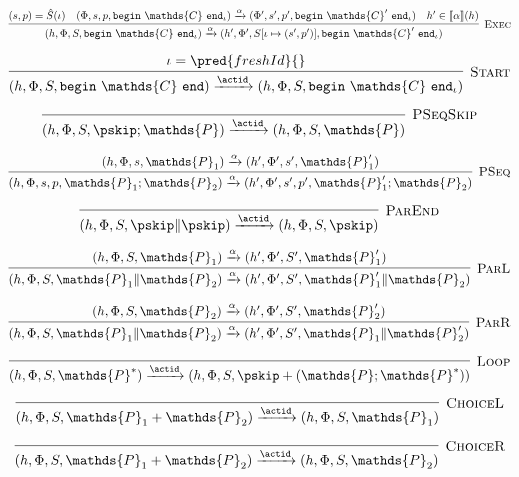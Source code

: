 \[
\infer[\textsc{Exec}]
{
	 (h, \Phi, S, \mathtt{begin}\ \mathds{C}\ \mathtt{end}_\iota)
	\xrightarrow{\alpha}
	(h', \Phi', S[\iota \mapsto (s', p')], \mathtt{begin}\ \mathds{C}'\ \mathtt{end}_\iota)
}
{
	(s, p) = \hat{S}(\iota) &
	(\Phi, s, p, \mathtt{begin}\ \mathds{C}\ \mathtt{end}_\iota)
	\xrightarrow{\alpha}
	(\Phi', s', p', \mathtt{begin}\ \mathds{C}'\ \mathtt{end}_\iota) &
	h' \in \llbracket \alpha \rrbracket (h)
}
\]

\[
\infer[\textsc{Start}]
{
	(h, \Phi, S, \mathtt{begin}\ \mathds{C}\ \mathtt{end})
	\xrightarrow{\actid}
	(h, \Phi, S, \mathtt{begin}\ \mathds{C}\ \mathtt{end}_\iota)
}
{
	\iota = \pred{freshId}{}
}
\]

\[
\infer[\textsc{PSeqSkip}]
{
	 (h, \Phi, S, \pskip; \mathds{P})
	\xrightarrow{\actid}
	(h, \Phi, S, \mathds{P})
}
{}
\]

\[
\infer[\textsc{PSeq}]
{
	 (h, \Phi, s, p, \mathds{P}_1; \mathds{P}_2)
	\xrightarrow{\alpha}
	(h', \Phi', s', p', \mathds{P}_1'; \mathds{P}_2)
}
{
	 (h, \Phi, s, \mathds{P}_1)
	\xrightarrow{\alpha}
	(h', \Phi', s', \mathds{P}_1')
}
\]

\[
\infer[\textsc{ParEnd}]
{
	 (h, \Phi, S, \pskip \| \pskip)
	\xrightarrow{\actid}
	(h, \Phi, S, \pskip)
}
{}
\]

\[
\infer[\textsc{ParL}]
{
	 (h, \Phi, S, \mathds{P}_1 \| \mathds{P}_2)
	\xrightarrow{\alpha}
	(h', \Phi', S', \mathds{P}_1' \| \mathds{P}_2)
}
{
	 (h, \Phi, S, \mathds{P}_1)
	\xrightarrow{\alpha}
	(h', \Phi', S', \mathds{P}_1')
}
\]

\[
\infer[\textsc{ParR}]
{
	 (h, \Phi, S, \mathds{P}_1 \| \mathds{P}_2)
	\xrightarrow{\alpha}
	(h', \Phi', S', \mathds{P}_1 \| \mathds{P}_2')
}
{
	 (h, \Phi, S, \mathds{P}_2)
	\xrightarrow{\alpha}
	(h', \Phi', S', \mathds{P}_2')
}
\]

\[
\infer[\textsc{Loop}]
{
	 (h, \Phi, S, \mathds{P}^*)
	\xrightarrow{\actid}
	(h, \Phi, S, \pskip + (\mathds{P} ; \mathds{P}^*))
}
{}
\]

\[
\infer[\textsc{ChoiceL}]
{
	 (h, \Phi, S, \mathds{P}_1 + \mathds{P}_2)
	\xrightarrow{\actid}
	(h, \Phi, S, \mathds{P}_1)
}
{}
\]

\[
\infer[\textsc{ChoiceR}]
{
	 (h, \Phi, S, \mathds{P}_1 + \mathds{P}_2)
	\xrightarrow{\actid}
	(h, \Phi, S, \mathds{P}_2)
}
{}
\]

